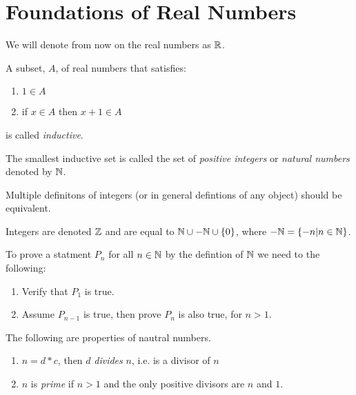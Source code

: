 

\section{Foundations of Real Numbers}

We will denote from now on the real numbers as \( \mathbb{R} \).

\begin{definition}
	A subset, \( A \), of real numbers that satisfies:
	\begin{enumerate}
		\item \( 1 \in A \)
		\item if \( x \in A \) then \( x + 1 \in A \)
	\end{enumerate}
	is called {\em inductive}.
	\label{inductiveset}
\end{definition}

\begin{definition}
	The smallest inductive set is called the set of {\em positive integers} or {\em natural
	numbers} denoted by \( \mathbb{N} \).
	\label{naturalnumbers}
\end{definition}

\begin{note}
	Multiple definitons of integers (or in general defintions of any object) should be
	equivalent.
\end{note}

\begin{definition}
	Integers are denoted \( \mathbb{Z} \) and are equal to \( \mathbb{N} \cup -\mathbb{N} \cup \left\{ 0 \right\} \),
	where \( - \mathbb{N} = \left\{ -n | n \in \mathbb{N} \right\} \).
	\label{Integers}
\end{definition}

\begin{principle}[Induction]
	To prove a statment \( P_n \) for all \( n \in \mathbb{N} \) by the defintion of \( \mathbb{N} \) we need to
	the following:
	\begin{enumerate}
		\item Verify that \( P_1 \) is true.
		\item Assume \( P_{n-1} \) is true, then prove \( P_n \) is also true, for \( n > 1 \).
	\end{enumerate}
	\label{induction}
\end{principle}

\begin{definition}[Properties]
	The following are properties of nautral numbers.
	\begin{enumerate}
		\item \( n = d*c \), then \( d \) {\em divides} \( n \), i.e. is a divisor of \( n \)
		\item \( n \) is {\em prime} if \( n > 1 \) and the only positive divisors are \( n
			\) and \( 1 \).
	\end{enumerate}
	\label{naturalproperties}
\end{definition}

